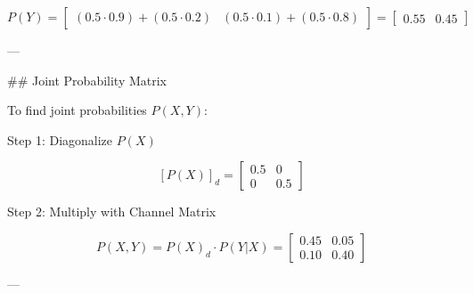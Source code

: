 \[
P(Y) = \begin{bmatrix}
(0.5 \cdot 0.9) + (0.5 \cdot 0.2) & 
(0.5 \cdot 0.1) + (0.5 \cdot 0.8)
\end{bmatrix}
= \begin{bmatrix} 0.55 & 0.45 \end{bmatrix}
\]

---

## Joint Probability Matrix

To find joint probabilities \( P(X, Y) \):

Step 1: Diagonalize \( P(X) \)

\[
[P(X)]_d = \begin{bmatrix}
0.5 & 0 \\
0 & 0.5
\end{bmatrix}
\]

Step 2: Multiply with Channel Matrix

\[
P(X, Y) = P(X)_d \cdot P(Y|X) = 
\begin{bmatrix}
0.45 & 0.05 \\
0.10 & 0.40
\end{bmatrix}
\]

---
